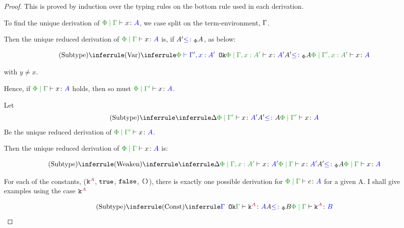 \documentclass{report}
\begin{document}
 
 \begin{framed}
        \begin{proof}
            This is proved by induction over the typing rules on the bottom rule used in each derivation.

            To find the unique derivation of $\gpetyperelation{x}{A}$, we case split on the term-environment, $\Gamma$.
            
            Then the unique reduced derivation of $\gpetyperelation{x}{A}$ is, if $A' {\color{blue} \leq\colon}_\Phi A$, as below:
            
            \begin{equation}
                \ntreeruleII{\vsubtype}{\ntreeruleI{\vvar}{\wellformedok{\P}{\G', x: A'}}{\etyperelation{\P}{\G,x: A'}{x}{A'}}}{ A' \subtypep A}{\etyperelation{\P}{\G', x: A'}{x}{A}}
            \end{equation}
            
             with $y \neq x$.
            
            Hence, if $\gpetyperelation{x}{A}$ holds, then so must $\etyperelation{\P}{\G'}{x}{A}$.
            
            Let 
            \begin{equation}
                \edeltavrule{\P}{\G'}{x}{A'}{A}
            \end{equation}
            Be the  unique reduced derivation of $\etyperelation{\P}{\G'}{x}{A}$.
            
            Then the unique reduced derivation of $\gpetyperelation{x}{A}$ is:
            
            
            \begin{equation}
                \ntreeruleII{\vsubtype}{
                    \ntreeruleI{\vweaken}{
                        \treeruleI{\D}{\etyperelation{\P}{\G, x: A'}{x}{A'}}
                    }{\gpetyperelation{x}{A'}}   
                }{ A' \subtypep A
                }{\gpetyperelation{x}{A}}
            \end{equation}
            
            \case{\vconst}
            For each of the constants, ($\texttt{k}^{\color{purple} A}$, $\texttt{true}$, $\texttt{false}$, $\texttt{()}$), there is exactly one possible derivation for $\etyperelation{\P}{\G}{c}{A}$ for a given A. I shall give examples using the case $\texttt{k}^{\color{purple} A}$
            
            
            $$
                \ntreeruleII{\vsubtype}{\truleconst}{ A \subtypep B}{\gpetyperelation{\const{A}}{B}}
            $$
            

\end{proof}
\end{framed}
\end{document}
